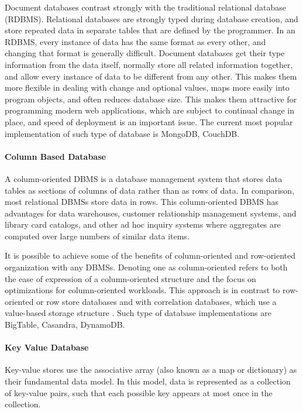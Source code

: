 Document databases contrast strongly with the traditional relational database (RDBMS). Relational databases are strongly typed during database creation, and store repeated data in separate tables that are defined by the programmer. In an RDBMS, every instance of data has the same format as every other, and changing that format is generally difficult. Document databases get their type information from the data itself, normally store all related information together, and allow every instance of data to be different from any other. This makes them more flexible in dealing with change and optional values, maps more easily into program objects, and often reduces database size. This makes them attractive for programming modern web applications, which are subject to continual change in place, and speed of deployment is an important issue. The current most popular implementation of such type of database is MongoDB, CouchDB.

\paragraph{Column Based Database}
A column-oriented DBMS is a database management system that stores data tables as sections of columns of data rather than as rows of data. In comparison, most relational DBMSs store data in rows. This column-oriented DBMS has advantages for data warehouses, customer relationship management systems, and library card catalogs, and other ad hoc inquiry systems where aggregates are computed over large numbers of similar data items.

It is possible to achieve some of the benefits of column-oriented and row-oriented organization with any DBMSs. Denoting one as column-oriented refers to both the ease of expression of a column-oriented structure and the focus on optimizations for column-oriented workloads. This approach is in contrast to row-oriented or row store databases and with correlation databases, which use a value-based storage structure \cite{wiki_column_based_db}. Such type of database implementations are BigTable, Casandra, DynamoDB.

\paragraph{Key Value Database}
Key-value stores use the associative array (also known as a map or dictionary) as their fundamental data model. In this model, data is represented as a collection of key-value pairs, such that each possible key appears at most once in the collection.

